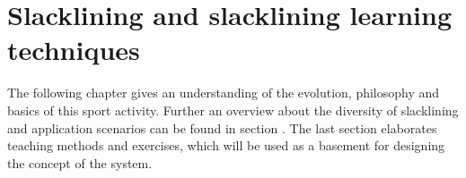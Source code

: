 \chapter{Slacklining  and slacklining learning techniques}\label{3_slacklining}
The following chapter \textit{} gives an understanding of the evolution, philosophy and basics of this sport activity. Further an overview about the diversity of slacklining and application scenarios can be found in section \textit{}. The last section \textit{} elaborates teaching methods and exercises, which will be used as a basement for designing the concept of the system.
 

 
 
 